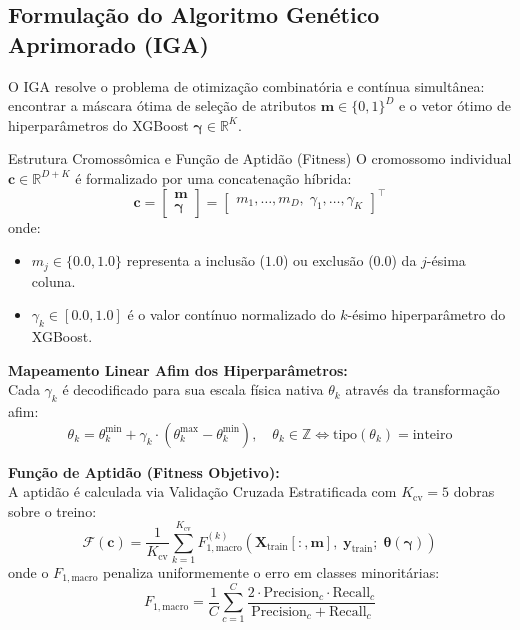 \documentclass[11pt,a4paper]{article}
\begin{document}
\subsection{Formulação do Algoritmo Genético Aprimorado (IGA)}
O IGA resolve o problema de otimização combinatória e contínua simultânea: encontrar a máscara ótima de seleção de atributos $\mathbf{m} \in \{0, 1\}^D$ e o vetor ótimo de hiperparâmetros do XGBoost $\boldsymbol{\gamma} \in \mathbb{R}^K$.

\begin{mathBox}{Estrutura Cromossômica e Função de Aptidão (Fitness)}
O cromossomo individual $\mathbf{c} \in \mathbb{R}^{D + K}$ é formalizado por uma concatenação híbrida:
\begin{equation}
  \mathbf{c} = \begin{bmatrix} \mathbf{m} \\ \boldsymbol{\gamma} \end{bmatrix} = \begin{bmatrix} m_1, \dots, m_D, \; \gamma_1, \dots, \gamma_K \end{bmatrix}^\top
\end{equation}
onde:
\begin{itemize}
  \item $m_j \in \{0.0, 1.0\}$ representa a inclusão ($1.0$) ou exclusão ($0.0$) da $j$-ésima coluna.
  \item $\gamma_k \in [0.0, 1.0]$ é o valor contínuo normalizado do $k$-ésimo hiperparâmetro do XGBoost.
\end{itemize}

\textbf{Mapeamento Linear Afim dos Hiperparâmetros:}\\
Cada $\gamma_k$ é decodificado para sua escala física nativa $\theta_k$ através da transformação afim:
\begin{equation}
  \theta_k = \theta_k^{\min} + \gamma_k \cdot (\theta_k^{\max} - \theta_k^{\min}), \quad \theta_k \in \mathbb{Z} \iff \text{tipo}(\theta_k) = \text{inteiro}
\end{equation}

\textbf{Função de Aptidão (Fitness Objetivo):}\\
A aptidão é calculada via Validação Cruzada Estratificada com $K_{\text{cv}} = 5$ dobras sobre o treino:
\begin{equation}
  \mathcal{F}(\mathbf{c}) = \frac{1}{K_{\text{cv}}} \sum_{k=1}^{K_{\text{cv}}} F_{1, \text{macro}}^{(k)}(\mathbf{X}_{\text{train}}[:, \mathbf{m}], \; \mathbf{y}_{\text{train}}; \; \boldsymbol{\theta}(\boldsymbol{\gamma}))
\end{equation}
onde o $F_{1, \text{macro}}$ penaliza uniformemente o erro em classes minoritárias:
\begin{equation}
  F_{1, \text{macro}} = \frac{1}{C} \sum_{c=1}^C \frac{2 \cdot \text{Precision}_c \cdot \text{Recall}_c}{\text{Precision}_c + \text{Recall}_c}
\end{equation}
\end{mathBox}
\end{document}
